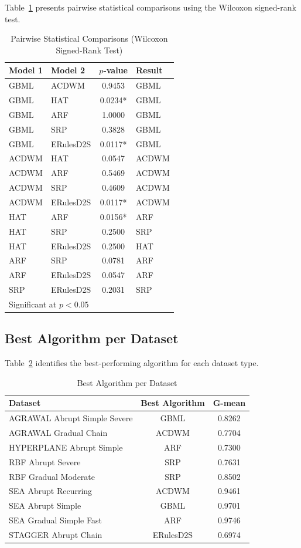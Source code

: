 \documentclass[conference]{IEEEtran}
\begin{document}
Table~\ref{tab:pairwise} presents pairwise statistical comparisons using the Wilcoxon signed-rank test.

\begin{table}[htbp]
\caption{Pairwise Statistical Comparisons (Wilcoxon Signed-Rank Test)}
\label{tab:pairwise}
\centering
\begin{tabular}{llcl}
\toprule
\textbf{Model 1} & \textbf{Model 2} & \textbf{$p$-value} & \textbf{Result} \\
\midrule
GBML & ACDWM & 0.9453 & GBML \\
GBML & HAT & 0.0234* & GBML \\
GBML & ARF & 1.0000 & GBML \\
GBML & SRP & 0.3828 & GBML \\
GBML & ERulesD2S & 0.0117* & GBML \\
ACDWM & HAT & 0.0547 & ACDWM \\
ACDWM & ARF & 0.5469 & ACDWM \\
ACDWM & SRP & 0.4609 & ACDWM \\
ACDWM & ERulesD2S & 0.0117* & ACDWM \\
HAT & ARF & 0.0156* & ARF \\
HAT & SRP & 0.2500 & SRP \\
HAT & ERulesD2S & 0.2500 & HAT \\
ARF & SRP & 0.0781 & ARF \\
ARF & ERulesD2S & 0.0547 & ARF \\
SRP & ERulesD2S & 0.2031 & SRP \\
\bottomrule
\multicolumn{4}{l}{\small * Significant at $p < 0.05$}
\end{tabular}
\end{table}


\subsection{Best Algorithm per Dataset}

Table~\ref{tab:best} identifies the best-performing algorithm for each dataset type.

\begin{table}[htbp]
\caption{Best Algorithm per Dataset}
\label{tab:best}
\centering
\begin{tabular}{lcc}
\toprule
\textbf{Dataset} & \textbf{Best Algorithm} & \textbf{G-mean} \\
\midrule
AGRAWAL Abrupt Simple Severe & GBML & 0.8262 \\
AGRAWAL Gradual Chain & ACDWM & 0.7704 \\
HYPERPLANE Abrupt Simple & ARF & 0.7300 \\
RBF Abrupt Severe & SRP & 0.7631 \\
RBF Gradual Moderate & SRP & 0.8502 \\
SEA Abrupt Recurring & ACDWM & 0.9461 \\
SEA Abrupt Simple & GBML & 0.9701 \\
SEA Gradual Simple Fast & ARF & 0.9746 \\
STAGGER Abrupt Chain & ERulesD2S & 0.6974 \\
\bottomrule
\end{tabular}
\end{table}
\end{document}
